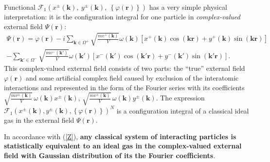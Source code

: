 \documentclass[aps,pre,preprint,floatfix,twoside,tightenlines,showpacs,
showkeys]{revtex4}
\begin{document}
Functional $ \mathcal{F}_{1}\left(x^{\pm}\left(\mathbf{k}\right),\ y^{\pm}\left(\mathbf{k}\right),\ \left\{\varphi\left(\mathbf{r}\right)\right\}\right) $ has a very simple physical interpretation: it is the configuration integral for one particle in {\em complex-valued} external field $\Psi\left(\textbf{r}\right)$:
\begin{equation}
\label{psi}
\begin{array}{r}
{\displaystyle 
\Psi\left(\mathbf{r}\right)=\varphi\left(\mathbf{r}\right) - i\sum_{\mathbf{k}\in\Omega^{+}}\sqrt{\frac{mv^{+} \left(\mathbf{k}\right)}{V}}\omega\left(\mathbf{k}\right) \left[x^{+}\left(\mathbf{k}\right) \cos\left(\mathbf{k}\mathbf{r}\right) + y^{+}\left(\mathbf{k}\right) \sin\left(\mathbf{k}\mathbf{r}\right)\right]}\\ 
{\displaystyle -
\sum_{\mathbf{k}{'}\in\Omega^{-}} \sqrt{\frac{mv^{-}\left(\mathbf{k}{'}\right)}{V}} \omega\left(\mathbf{k}{'}\right) \left[x^{-}\left(\mathbf{k}{'}\right)\cos \left(\mathbf{k}{'}\mathbf{r}\right) + y^{-}\left(\mathbf{k}'\right)\sin\left(\mathbf{k}'\mathbf{r}\right)\right]}.
\end{array}
\end{equation}
This complex-valued external field consists of two parts: the ``true'' external field $\varphi\left(\mathbf{r}\right)$ and some 
artificial complex field caused by exclusion of the interatomic interactions   and represented in the form of the Fourier series with 
its coefficients $\sqrt{\frac{mv^{\pm}\left(\mathbf{k}\right)}{V}}\, \omega\left(\mathbf{k}\right)x^{\pm}\left(\mathbf{k}\right)$, $\sqrt{\frac{mv^{\pm}\left(\mathbf{k}\right)}{V}}\, \omega\left(\mathbf{k}\right)y^{\pm}\left(\mathbf{k}\right)$. 
The expression $\mathcal{F}_{1}\left(x^{\pm}\left(\mathbf{k}\right), y^{\pm}\left(\mathbf{k}\right), \left\{\varphi\left(\textbf{r}\right)\right\}\right)^{N}$ is a configuration integral of a classical ideal gas in the external 
field $\Psi\left(\textbf{r}\right)$.

In accordance with (\ref{Z}), {\bf any classical system of interacting particles is statistically equivalent to an ideal gas in the complex-valued external field with Gaussian distribution of its the Fourier coefficients}.
\end{document}
